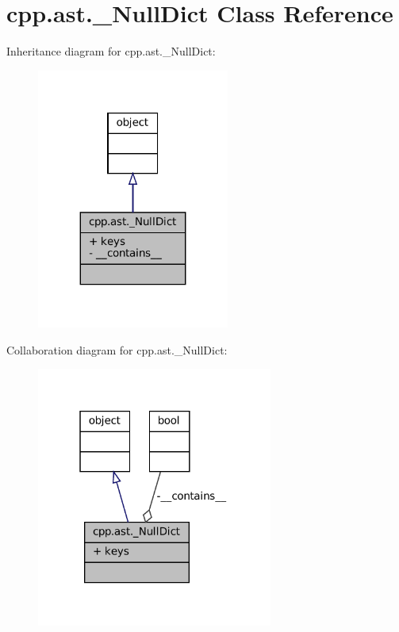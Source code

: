 \hypertarget{classcpp_1_1ast_1_1__NullDict}{}\section{cpp.\+ast.\+\_\+\+Null\+Dict Class Reference}
\label{classcpp_1_1ast_1_1__NullDict}


Inheritance diagram for cpp.\+ast.\+\_\+\+Null\+Dict\+:
\nopagebreak
\begin{figure}[H]
\begin{center}
\leavevmode
\includegraphics[width=179pt]{classcpp_1_1ast_1_1__NullDict__inherit__graph}
\end{center}
\end{figure}


Collaboration diagram for cpp.\+ast.\+\_\+\+Null\+Dict\+:
\nopagebreak
\begin{figure}[H]
\begin{center}
\leavevmode
\includegraphics[width=220pt]{classcpp_1_1ast_1_1__NullDict__coll__graph}
\end{center}
\end{figure}
